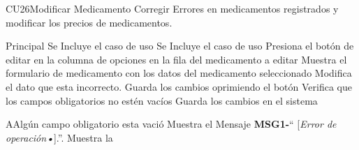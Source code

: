 \begin{UseCase}{CU26}{Modificar Medicamento}{
	Corregir Errores en medicamentos registrados y modificar los precios de medicamentos.
	}
	\end{UseCase}
	\begin{UCtrayectoria}{Principal}
		\UCpaso Se Incluye el caso de uso 
		\UCpaso Se Incluye el caso de uso  
		\UCpaso [\UCactor] Presiona el botón de editar en la columna de opciones en la fila del medicamento a editar
		\UCpaso Muestra el formulario de medicamento  con los datos del medicamento seleccionado
		\UCpaso [\UCactor] Modifica el dato que esta incorrecto.
		\UCpaso [\UCactor] Guarda los cambios oprimiendo el botón 
		\UCpaso Verifica que los campos obligatorios no estén vacíos
		\UCpaso Guarda los cambios en el sistema 
	\end{UCtrayectoria}


\begin{UCtrayectoriaA}{A}{Algún campo obligatorio esta vació}
	\UCpaso Muestra el Mensaje {\bf MSG1-}`` [{\em Error de operación\textsl{•}}].''.
			\UCpaso Muestra la 
\end{UCtrayectoriaA}